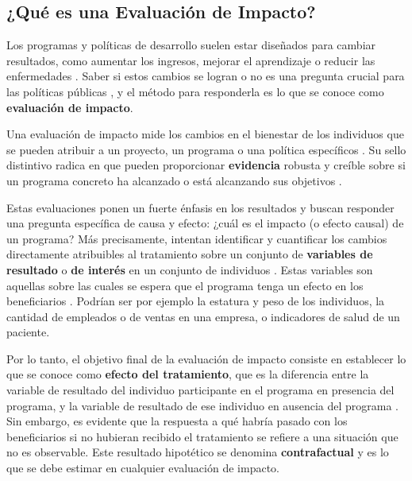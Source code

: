 \documentclass[../../main.tex]{subfiles}
\begin{document}
\subsection{¿Qué es una Evaluación de Impacto?}

Los programas y políticas de desarrollo suelen estar diseñados para cambiar resultados,
como aumentar los ingresos, mejorar el aprendizaje o reducir las enfermedades
\cite{gertler-2016}. Saber si estos cambios se logran o no es una pregunta crucial para
las políticas públicas \cite{gertler-2016}, y el método para responderla es lo que se
conoce como \textbf{evaluación de impacto}.

Una evaluación de impacto mide los cambios en el bienestar de los individuos que se pueden
atribuir a un proyecto, un programa o una política específicos \cite{gertler-2016}. Su
sello distintivo radica en que pueden proporcionar \textbf{evidencia} robusta y creíble
sobre si un programa concreto ha alcanzado o está alcanzando sus objetivos
\cite{gertler-2016}.

Estas evaluaciones ponen un fuerte énfasis en los resultados y buscan responder una
pregunta específica de causa y efecto: ¿cuál es el impacto (o efecto causal) de un
programa? Más precisamente, intentan identificar  y cuantificar los cambios directamente
atribuibles al tratamiento \cite{gertler-2016} sobre un conjunto de \textbf{variables de
resultado} o \textbf{de interés} en un conjunto de individuos \cite{bernal}. Estas
variables son aquellas sobre las cuales se espera que el programa tenga un efecto en los
beneficiarios \cite{bernal}. Podrían ser por ejemplo la estatura y peso de los individuos,
la cantidad de empleados o de ventas en una empresa, o indicadores de salud de un
paciente.

Por lo tanto, el objetivo final de la evaluación de impacto consiste en establecer lo que
se conoce como \textbf{efecto del tratamiento}, que es la diferencia entre la variable de
resultado del individuo participante en el programa en presencia del programa, y la
variable de resultado de ese individuo en ausencia del programa \cite{bernal}. Sin
embargo, es evidente que la respuesta a qué habría pasado con los beneficiarios si no
hubieran recibido el tratamiento se refiere a una situación que no es observable. Este
resultado hipotético se denomina \textbf{contrafactual} y es lo que se debe estimar en
cualquier evaluación de impacto.
\end{document}
